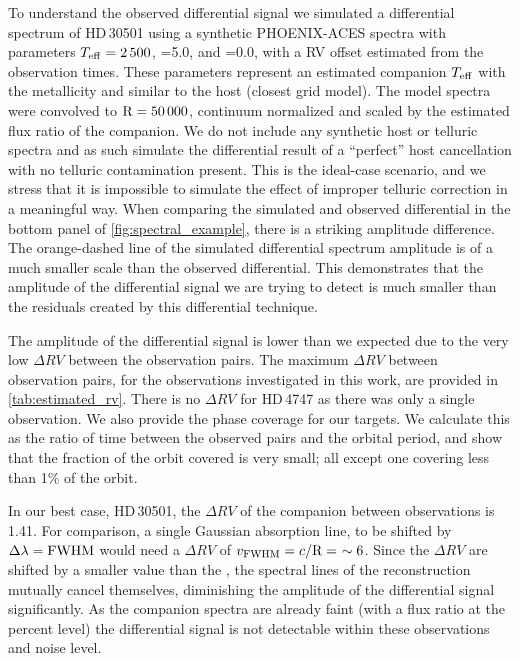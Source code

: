 To understand the observed differential signal we simulated a differential spectrum of {HD\,30501} using a synthetic {PHOENIX-ACES} spectra with parameters \(T_{\mathrm{eff}}{}=2\,500\)\K{}, \logg{}=5.0, and \feh{}=0.0, with a {RV} offset estimated from the observation times.
These parameters represent an estimated companion \(T_{\mathrm{eff}}{}\) with the metallicity and \logg{} similar to the host (closest grid model).
The model spectra were convolved to \(\textrm{R}=50\,000\), continuum normalized and scaled by the estimated flux ratio of the companion.
We do not include any synthetic host or telluric spectra and as such simulate the differential result of a ``perfect'' host cancellation with no telluric contamination present.
This is the ideal-case scenario, and we stress that it is impossible to simulate the effect of improper telluric correction in a meaningful way.
When comparing the simulated and observed differential in the bottom panel of \cref{fig:spectral_example}, there is a striking amplitude difference.
The orange-dashed line of the simulated differential spectrum amplitude is of a much smaller scale than the observed differential.
This demonstrates that the amplitude of the differential signal we are trying to detect is much smaller than the residuals created by this differential technique.

The amplitude of the differential signal is lower than we expected due to the very low \(\Delta {RV}\) between the observation pairs.
The maximum \(\Delta {RV}\) between observation pairs, for the observations investigated in this work, are provided in \cref{tab:estimated_rv}.
{\red{} There is no \(\Delta {RV}\) for {HD\,4747} as there was only a single observation.
We also provide the phase coverage for our targets.
We calculate this as the ratio of time between the observed pairs and the orbital period, and show that the fraction of the orbit covered is very small; all except one covering less than 1\% of the orbit.}

In our best case, {HD\,30501}, the \(\Delta {RV}\) of the companion between observations is 1.41\kmps{}.
For comparison, a single Gaussian absorption line, to be shifted by \(\Delta\lambda = {\textrm{FWHM}}\) would need a \(\Delta {RV}\) of \(v_{\textrm{FWHM}} = c/\textrm{R} =~\sim6\)\kmps{}.
Since the \(\Delta {RV}\) are shifted by a smaller value than the {\fwhm}, the spectral lines of the reconstruction mutually cancel themselves, diminishing the amplitude of the differential signal significantly.
As the companion spectra are already faint (with a flux ratio at the percent level) the differential signal is not detectable within these observations and noise level.

